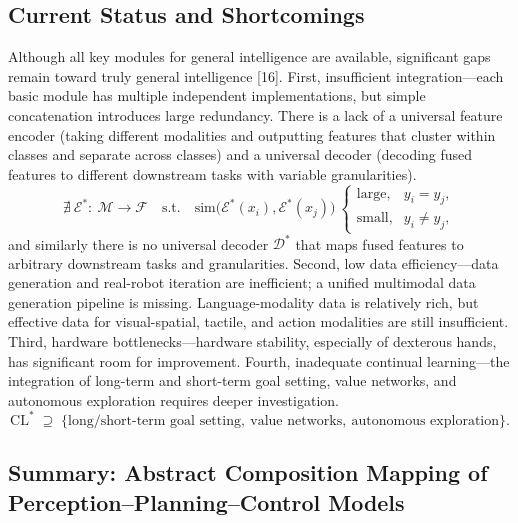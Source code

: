\documentclass[12pt,a4paper]{article}
\begin{document}
\subsection{Current Status and Shortcomings}
Although all key modules for general intelligence are available, significant gaps remain toward truly general intelligence [16].
First, insufficient integration---each basic module has multiple independent implementations, but simple concatenation introduces large redundancy. There is a lack of a universal feature encoder (taking different modalities and outputting features that cluster within classes and separate across classes) and a universal decoder (decoding fused features to different downstream tasks with variable granularities).
\begin{equation}
\nexists\ \mathcal{E}^{*}:\ \mathcal{M}\to\mathcal{F}\quad\text{s.t.}\quad
\mathrm{sim}\bigl(\mathcal{E}^{*}(x_i),\mathcal{E}^{*}(x_j)\bigr)\ \begin{cases}
\text{large}, & y_i=y_j,\\
\text{small}, & y_i\neq y_j,
\end{cases}
\label{eq:universal-encoder-gap}
\end{equation}
and similarly there is no universal decoder $\mathcal{D}^{*}$ that maps fused features to arbitrary downstream tasks and granularities.
Second, low data efficiency---data generation and real-robot iteration are inefficient; a unified multimodal data generation pipeline is missing. Language-modality data is relatively rich, but effective data for visual-spatial, tactile, and action modalities are still insufficient.
Third, hardware bottlenecks---hardware stability, especially of dexterous hands, has significant room for improvement.
Fourth, inadequate continual learning---the integration of long-term and short-term goal setting, value networks, and autonomous exploration requires deeper investigation.
\begin{equation}
\mathrm{CL}^{*}\;\supseteq\;\bigl\{\text{long/short-term goal setting},\ \text{value networks},\ \text{autonomous exploration}\bigr\}.
\label{eq:continual-learning-need}
\end{equation}

\subsection{Summary: Abstract Composition Mapping of Perception--Planning--Control Models}
\end{document}
